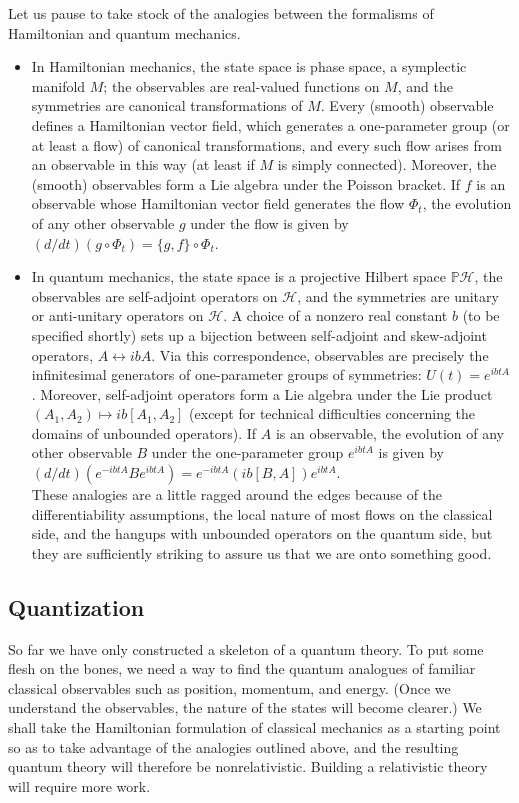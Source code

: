 \documentclass[10pt, letterpaper]{article}
\begin{document}
Let us pause to take stock of the analogies between the formalisms of Hamiltonian and quantum mechanics.

\begin{itemize}
  \item In Hamiltonian mechanics, the state space is phase space, a symplectic manifold $M$; the observables are real-valued functions on $M$, and the symmetries are canonical transformations of $M$. Every (smooth) observable defines a Hamiltonian vector field, which generates a one-parameter group (or at least a flow) of canonical transformations, and every such flow arises from an observable in this way (at least if $M$ is simply connected). Moreover, the (smooth) observables form a Lie algebra under the Poisson bracket. If $f$ is an observable whose Hamiltonian vector field generates the flow $\Phi_{t}$, the evolution of any other observable $g$ under the flow is given by $(d / d t)\left(g \circ \Phi_{t}\right)=\{g, f\} \circ \Phi_{t}$.
  \item In quantum mechanics, the state space is a projective Hilbert space $\mathbb{P} \mathcal{H}$, the observables are self-adjoint operators on $\mathcal{H}$, and the symmetries are unitary or anti-unitary operators on $\mathcal{H}$. A choice of a nonzero real constant $b$ (to be specified shortly) sets up a bijection between self-adjoint and skew-adjoint operators, $A \leftrightarrow i b A$. Via this correspondence, observables are precisely the infinitesimal generators of one-parameter groups of symmetries: $U(t)=e^{i b t A}$. Moreover, self-adjoint operators form a Lie algebra under the Lie product $\left(A_{1}, A_{2}\right) \mapsto i b\left[A_{1}, A_{2}\right]$ (except for technical difficulties concerning the domains of unbounded operators). If $A$ is an observable, the evolution of any other observable $B$ under the one-parameter group $e^{i b t A}$ is given by $(d / d t)\left(e^{-i b t A} B e^{i b t A}\right)=e^{-i b t A}(i b[B, A]) e^{i b t A}$.\\
These analogies are a little ragged around the edges because of the differentiability assumptions, the local nature of most flows on the classical side, and the hangups with unbounded operators on the quantum side, but they are sufficiently striking to assure us that we are onto something good.
\end{itemize}

\subsection*{Quantization}
So far we have only constructed a skeleton of a quantum theory. To put some flesh on the bones, we need a way to find the quantum analogues of familiar classical observables such as position, momentum, and energy. (Once we understand the observables, the nature of the states will become clearer.) We shall take the Hamiltonian formulation of classical mechanics as a starting point so as to take advantage of the analogies outlined above, and the resulting quantum theory will therefore be nonrelativistic. Building a relativistic theory will require more work.
\end{document}
